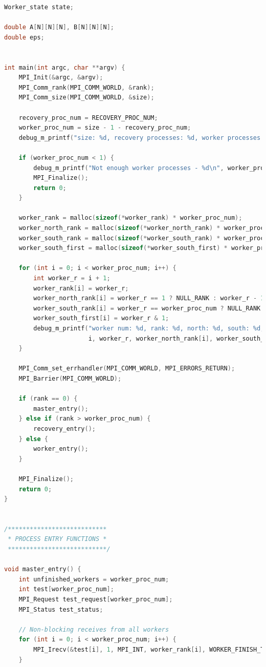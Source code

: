 \documentclass[a4paper]{article}
\begin{document}
\begin{lstlisting}[caption=jac\_3d\_mpi\_ft.c, label={lst:2}, language=C]
Worker_state state;

double A[N][N][N], B[N][N][N];
double eps;


int main(int argc, char **argv) {
    MPI_Init(&argc, &argv);
    MPI_Comm_rank(MPI_COMM_WORLD, &rank);
    MPI_Comm_size(MPI_COMM_WORLD, &size);

    recovery_proc_num = RECOVERY_PROC_NUM;
    worker_proc_num = size - 1 - recovery_proc_num;
    debug_m_printf("size: %d, recovery processes: %d, worker processes: %d\n", size, recovery_proc_num, worker_proc_num);

    if (worker_proc_num < 1) {
        debug_m_printf("Not enough worker processes - %d\n", worker_proc_num);
        MPI_Finalize();
        return 0;
    }

    worker_rank = malloc(sizeof(*worker_rank) * worker_proc_num);
    worker_north_rank = malloc(sizeof(*worker_north_rank) * worker_proc_num);
    worker_south_rank = malloc(sizeof(*worker_south_rank) * worker_proc_num);
    worker_south_first = malloc(sizeof(*worker_south_first) * worker_proc_num);

    for (int i = 0; i < worker_proc_num; i++) {
        int worker_r = i + 1;
        worker_rank[i] = worker_r;
        worker_north_rank[i] = worker_r == 1 ? NULL_RANK : worker_r - 1;
        worker_south_rank[i] = worker_r == worker_proc_num ? NULL_RANK : worker_r + 1;
        worker_south_first[i] = worker_r & 1;
        debug_m_printf("worker num: %d, rank: %d, north: %d, south: %d, south_first: %d\n",
                       i, worker_r, worker_north_rank[i], worker_south_rank[i], worker_south_first[i]);
    }

    MPI_Comm_set_errhandler(MPI_COMM_WORLD, MPI_ERRORS_RETURN);
    MPI_Barrier(MPI_COMM_WORLD);

    if (rank == 0) {
        master_entry();
    } else if (rank > worker_proc_num) {
        recovery_entry();
    } else {
        worker_entry();
    }

    MPI_Finalize();
    return 0;
}


/***************************
 * PROCESS ENTRY FUNCTIONS *
 ***************************/

void master_entry() {
    int unfinished_workers = worker_proc_num;
    int test[worker_proc_num];
    MPI_Request test_request[worker_proc_num];
    MPI_Status test_status;

    // Non-blocking receives from all workers
    for (int i = 0; i < worker_proc_num; i++) {
        MPI_Irecv(&test[i], 1, MPI_INT, worker_rank[i], WORKER_FINISH_TAG, MPI_COMM_WORLD, &test_request[i]);
    }


\end{lstlisting}
\end{document}

